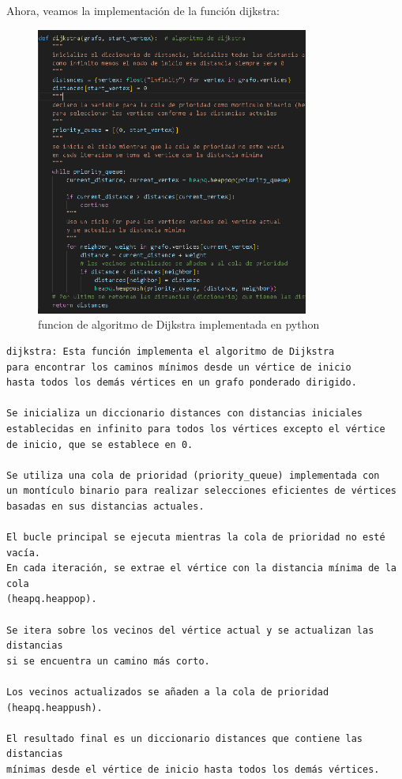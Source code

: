 \documentclass{article}
\begin{document}
Ahora, veamos la implementación de la función dijkstra:
\begin{figure}[H]
    \centering
    \includegraphics[width=0.8\textwidth]{figura_2_dijkstra.PNG}
    \caption{funcion de algoritmo de Dijkstra implementada en python}
    \label{figura 2}
\end{figure}
\begin{verbatim}
dijkstra: Esta función implementa el algoritmo de Dijkstra 
para encontrar los caminos mínimos desde un vértice de inicio 
hasta todos los demás vértices en un grafo ponderado dirigido.

Se inicializa un diccionario distances con distancias iniciales 
establecidas en infinito para todos los vértices excepto el vértice 
de inicio, que se establece en 0.

Se utiliza una cola de prioridad (priority_queue) implementada con 
un montículo binario para realizar selecciones eficientes de vértices 
basadas en sus distancias actuales.

El bucle principal se ejecuta mientras la cola de prioridad no esté vacía. 
En cada iteración, se extrae el vértice con la distancia mínima de la cola 
(heapq.heappop).

Se itera sobre los vecinos del vértice actual y se actualizan las distancias 
si se encuentra un camino más corto.

Los vecinos actualizados se añaden a la cola de prioridad (heapq.heappush).

El resultado final es un diccionario distances que contiene las distancias 
mínimas desde el vértice de inicio hasta todos los demás vértices.
\end{verbatim}
\end{document}
